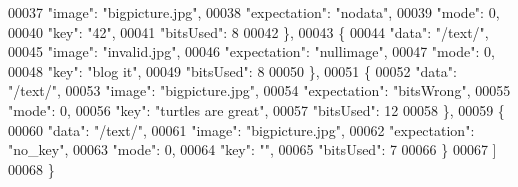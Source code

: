 \begin{DoxyCode}
00037             \textcolor{stringliteral}{"image"}: \textcolor{stringliteral}{"bigpicture.jpg"},
00038             \textcolor{stringliteral}{"expectation"}: \textcolor{stringliteral}{"nodata"},
00039             \textcolor{stringliteral}{"mode"}: 0,
00040             \textcolor{stringliteral}{"key"}: \textcolor{stringliteral}{"42"},
00041             \textcolor{stringliteral}{"bitsUsed"}: 8
00042         \},
00043         \{
00044             \textcolor{stringliteral}{"data"}: \textcolor{stringliteral}{"/text/"},
00045             \textcolor{stringliteral}{"image"}: \textcolor{stringliteral}{"invalid.jpg"},
00046             \textcolor{stringliteral}{"expectation"}: \textcolor{stringliteral}{"nullimage"},
00047             \textcolor{stringliteral}{"mode"}: 0,
00048             \textcolor{stringliteral}{"key"}: \textcolor{stringliteral}{"blog it"},
00049             \textcolor{stringliteral}{"bitsUsed"}: 8
00050         \},
00051         \{
00052             \textcolor{stringliteral}{"data"}: \textcolor{stringliteral}{"/text/"},
00053             \textcolor{stringliteral}{"image"}: \textcolor{stringliteral}{"bigpicture.jpg"},
00054             \textcolor{stringliteral}{"expectation"}: \textcolor{stringliteral}{"bitsWrong"},
00055             \textcolor{stringliteral}{"mode"}: 0,
00056             \textcolor{stringliteral}{"key"}: \textcolor{stringliteral}{"turtles are great"},
00057             \textcolor{stringliteral}{"bitsUsed"}: 12
00058         \},
00059         \{
00060             \textcolor{stringliteral}{"data"}: \textcolor{stringliteral}{"/text/"},
00061             \textcolor{stringliteral}{"image"}: \textcolor{stringliteral}{"bigpicture.jpg"},
00062             \textcolor{stringliteral}{"expectation"}: \textcolor{stringliteral}{"no\_key"},
00063             \textcolor{stringliteral}{"mode"}: 0,
00064             \textcolor{stringliteral}{"key"}: \textcolor{stringliteral}{""},
00065             \textcolor{stringliteral}{"bitsUsed"}: 7
00066         \}
00067     ]
00068 \}
\end{DoxyCode}
